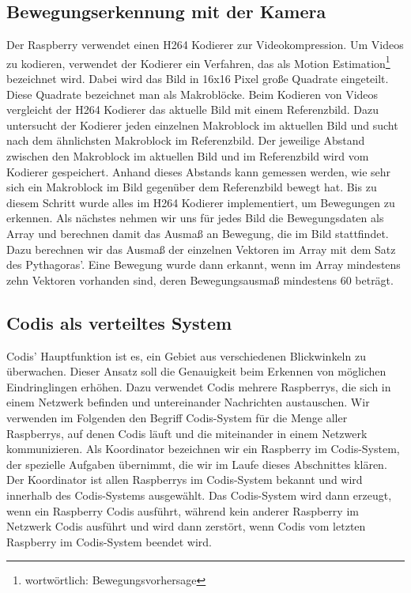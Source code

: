 \documentclass[journal]{IEEEtran}
\begin{document}
\subsection{Bewegungserkennung mit der Kamera}

Der Raspberry verwendet einen H264 Kodierer zur Videokompression. Um Videos zu kodieren, verwendet der Kodierer ein Verfahren, das als Motion Estimation\footnote{wortwörtlich: Bewegungsvorhersage}\cite{estimation} bezeichnet wird. Dabei wird das Bild in 16x16 Pixel große Quadrate eingeteilt. Diese Quadrate bezeichnet man als Makroblöcke. Beim Kodieren von Videos vergleicht der H264 Kodierer das aktuelle Bild mit einem Referenzbild. Dazu untersucht der Kodierer jeden einzelnen Makroblock im aktuellen Bild und sucht nach dem ähnlichsten Makroblock im Referenzbild. Der jeweilige Abstand zwischen den Makroblock im aktuellen Bild und im Referenzbild wird vom Kodierer gespeichert. Anhand dieses Abstands kann gemessen werden, wie sehr sich ein Makroblock im Bild gegenüber dem Referenzbild bewegt hat. Bis zu diesem Schritt wurde alles im H264 Kodierer implementiert, um Bewegungen zu erkennen.\cite{vektoren} Als nächstes nehmen wir uns für jedes Bild die Bewegungsdaten als Array und berechnen damit das Ausmaß an Bewegung, die im Bild stattfindet. Dazu berechnen wir das Ausmaß der einzelnen Vektoren im Array mit dem Satz des Pythagoras'. Eine Bewegung wurde dann erkannt, wenn im Array mindestens zehn Vektoren vorhanden sind, deren Bewegungsausmaß mindestens 60 beträgt.

\subsection{Codis als verteiltes System}

Codis' Hauptfunktion ist es, ein Gebiet aus verschiedenen Blickwinkeln zu überwachen. Dieser Ansatz soll die Genauigkeit beim Erkennen von möglichen Eindringlingen erhöhen. Dazu verwendet Codis mehrere Raspberrys, die sich in einem Netzwerk befinden und untereinander Nachrichten austauschen. Wir verwenden im Folgenden den Begriff Codis-System für die Menge aller Raspberrys, auf denen Codis läuft und die miteinander in einem Netzwerk kommunizieren. Als Koordinator bezeichnen wir ein Raspberry im Codis-System, der spezielle Aufgaben übernimmt, die wir im Laufe dieses Abschnittes klären. Der Koordinator ist allen Raspberrys im Codis-System bekannt und wird innerhalb des Codis-Systems ausgewählt. Das Codis-System wird dann erzeugt, wenn ein Raspberry Codis ausführt, während kein anderer Raspberry im Netzwerk Codis ausführt und wird dann zerstört, wenn Codis vom letzten Raspberry im Codis-System beendet wird. 
\end{document}
